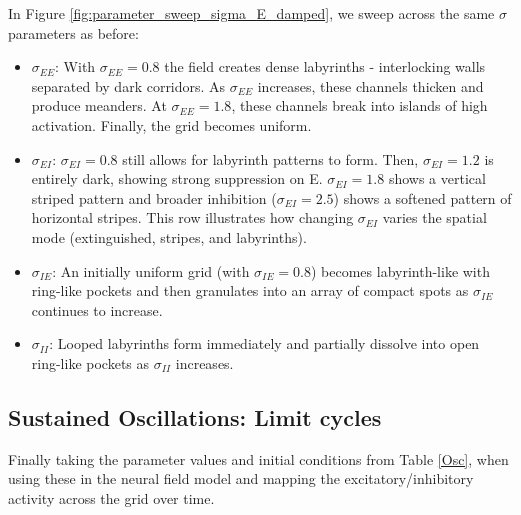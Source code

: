 \documentclass[10pt]{article}
\begin{document}
\begin{flushleft}
\begin{minipage}[t]{0.59\textwidth}
    \begin{flushleft}
            In Figure \ref{fig:parameter_sweep_sigma_E_damped}, we sweep across the same $\sigma$ parameters as before:
            \begin{itemize}
                \item $\sigma_{EE}$: With $\sigma_{EE}=0.8$ the field creates dense labyrinths - interlocking walls separated by dark corridors. As $\sigma_{EE}$ increases, these channels thicken and produce meanders. At $\sigma_{EE}=1.8$, these channels break into islands of high activation. Finally, the grid becomes uniform.
                \item $\sigma_{EI}$: $\sigma_{EI}=0.8$ still allows for labyrinth patterns to form. Then, $\sigma_{EI}=1.2$ is entirely dark, showing strong suppression on E. $\sigma_{EI}=1.8$ shows a vertical striped pattern and broader inhibition ($\sigma_{EI}=2.5$) shows a softened pattern of horizontal stripes. This row illustrates how changing $\sigma_{EI}$ varies the spatial mode (extinguished, stripes, and labyrinths).
                \item $\sigma_{IE}$: An initially uniform grid (with $\sigma_{IE}=0.8$) becomes labyrinth-like with ring-like pockets and then granulates into an array of compact spots as $\sigma_{IE}$ continues to increase.
                \item $\sigma_{II}$: Looped labyrinths form immediately and partially dissolve into open ring-like pockets as $\sigma_{II}$ increases.
            \end{itemize}
    \end{flushleft}

\end{minipage}



\subsection{Sustained Oscillations: Limit cycles}

\begin{flushleft}
Finally taking the parameter values and initial conditions from Table \ref{Osc}, when using these in the neural field model and mapping the excitatory/inhibitory activity across the grid over time.
\end{flushleft}


\end{flushleft}
\end{document}
